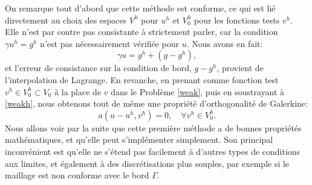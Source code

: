 \documentclass[11pt]{book}
\newtheorem{theorem}{Théorème}[section]
\newcommand{\bt}{\begin{theorem}}
\newcommand{\et}{\end{theorem}}
\newcommand{\pf}{\textbf{Preuve : }}
\newcommand{\cqfd}{{$\mbox{}$\hfill$\square$}}
\newcommand{\R}{\mathbb{R}}
\begin{document}

%
%
%

On remarque tout d'abord que cette méthode est conforme, ce qui est lié directement au choix des espaces $V^h$ pour $u^h$ et $V^h_0$ pour les fonctions tests $v^h$. Elle n'est par contre pas consistante à strictement parler, car la condition $\gamma u^h = g^h$ n'est pas nécessairement vérifiée pour $u$. Nous avons en fait:
\[
\gamma u = g^h + ( g - g^h),
\]
et l'erreur de consistance sur la condition de bord, $g - g^h$, provient de l'interpolation de Lagrange.
En revanche, en prenant comme fonction test $v^h \in V^h_0 \subset V_0$ à la place de $v$ dans le Problème \eqref{weak}, puis en soustrayant à \eqref{weakh}, nous obtenons tout de même une propriété d'orthogonalité de Galerkine:
\begin{equation} \label{galerkine}
a ( u - u^h , v^h ) = 0,\quad \forall v^h \in V^h_0.
\end{equation}
 Nous allons voir par la suite que cette première méthode a de bonnes propriétés mathématiques, et qu'elle peut s'implémenter simplement. 
Son principal inconvénient est qu'elle ne s'étend pas facilement à d'autres types de conditions aux limites, et également à des discrétisations plus souples, par exemple si le maillage est non conforme avec le bord $\Gamma$.
\end{document}
